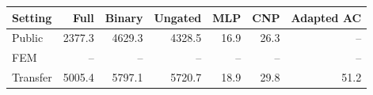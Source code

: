 \begin{tabular}{lrrrrrr}
\toprule
Setting & Full & Binary & Ungated & MLP & CNP & Adapted AC \\
\midrule
Public & 2377.3 & 4629.3 & 4328.5 & 16.9 & 26.3 & -- \\
FEM & -- & -- & -- & -- & -- & -- \\
Transfer & 5005.4 & 5797.1 & 5720.7 & 18.9 & 29.8 & 51.2 \\
\bottomrule
\end{tabular}
